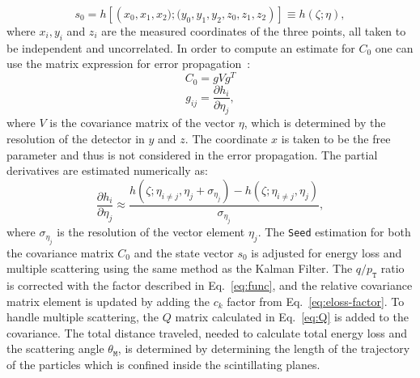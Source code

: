 \begin{equation}
    s_0 = h\left[\left(x_0,x_1,x_2);(y_0,y_1,y_2,z_0,z_1, z_2\right)\right]\equiv h(\zeta;\eta) ,
\end{equation}
where $x_i,y_i$ and $z_i$ are the measured coordinates of the three points, all taken to be independent and uncorrelated. In order to compute an estimate for $C_0$ one can use the matrix expression for error propagation~\cite{Cov}:
\begin{equation}\label{eq:error_Prop}
    C_0 = gVg^T 
\end{equation}
\begin{equation}
   g_{ij}  = \frac{\partial h_i}{\partial \eta_j},
\end{equation}
where $V$ is the covariance matrix of the vector $\eta$, which is determined by the resolution of the detector in $y$ and $z$. The coordinate $x$ is taken to be the free parameter and thus is not considered in the error propagation. The partial derivatives are estimated numerically as:
\begin{equation}
    \frac{\partial h_i}{\partial \eta_j} \approx \frac{h(\zeta;\eta_{i\neq j},\eta_j+\sigma_{\eta_j})-h(\zeta;\eta_{i\neq j},\eta_j)} {\sigma_{\eta_j}},
\end{equation}
where $\sigma_{\eta_j}$ is the resolution of the vector element $\eta_j$. The \texttt{Seed} estimation for both the covariance matrix $C_0$ and the state vector $s_0$ is adjusted for energy loss and multiple scattering using the same method as the Kalman Filter. The $q/p_\texttt{T}$ ratio is corrected with the factor described in Eq.~\ref{eq:func}, and the relative covariance matrix element is updated by adding the $c_k$ factor from Eq.~\ref{eq:eloss-factor}. To handle multiple scattering, the $Q$ matrix calculated in Eq.~\ref{eq:Q} is added to the covariance. The total distance traveled, needed to calculate total energy loss and the scattering angle $\theta_\texttt{M}$, is determined by determining the length of the trajectory of the particles which is confined inside the scintillating planes. 

